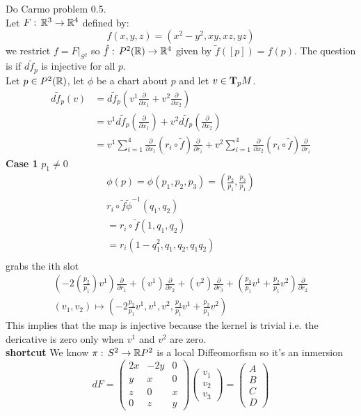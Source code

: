 Do Carmo problem 0.5.\\
Let $F:\, \mathbb{R}^3 \to \mathbb{R}^4$ defined by:
$$f(x,y,z) = (x^2-y^2, xy, xz, yz)$$
we restrict $f=F|_{S^2}$ so $\hat f :\, P^2(\mathbb{R}) \to \mathbb{R}^4$ given by $\tilde f([p])=f(p)$. The question is if $d\tilde f_p$ is injective for all $p$.\\
Let $p\in P^2(\mathbb{R})$, let $\phi$ be a chart about $p$ and let $v\in \text{\textbf{T}}_pM$.
\begin{align*}
d\tilde f_p(v) &= d\tilde f_p(v^1\frac{\partial}{\partial x_1} + v^2 \frac{\partial}{\partial x_ 2} ) \\
%
&= v^1 d\tilde f_p(\frac{\partial}{\partial x_1} ) + v^2d\tilde f_p(\frac{\partial}{\partial x_2} )\\
%
&= v^1 \sum_{i=1}^4 \frac{\partial}{\partial x_1} (r_i\circ \tilde f) \frac{\partial}{\partial r_i} + v^2 \sum_{i=1}^4 \frac{\partial}{\partial x_2} (r_i\circ \tilde f) \frac{\partial}{\partial r_i}
\end{align*}
\textbf{Case 1} $p_1 \neq 0$ 
\begin{gather*}
 \phi(p)=\phi(p_1,p_2,p_3) = \left(\frac{p_2}{p_1}, \frac{p_3}{p_1} \right)\\
r_i\circ \tilde f \tilde \phi ^{-1} (q_1,q_2)\\
= r_i\circ \tilde f(1,q_1,q_2) \\
= r_i(1-q_1^2,q_1,q_2,q_1q_2)\\
\end{gather*}
grabs the ith slot  
\begin{gather*}
(-2\left(\frac{p_2}{p_1}\right)v^1) \frac{\partial}{\partial r_1}  + (v^1) \frac{\partial}{\partial r_2} + (v^2) \frac{\partial}{\partial r_3} + (\frac{p_3}{p_1} v^1 + \frac{p_2}{p_1} v^2) \frac{\partial}{\partial r_2} \\
(v_1,v_2) \mapsto \left(-2\frac{p_2}{p_1} v^1,v^1,v^2,\frac{p_3}{p_1}v^1 + \frac{p_2}{p_1}v^2 \right)
\end{gather*}
This implies that the map is injective because the kernel is trivial i.e. the dericative is zero only when $v^1$ and $v^2$ are zero.\\
\textbf{shortcut}
We know $\pi:\, S^2 \to \mathbb{R} P^2$ is a local Diffeomorfism so it's an inmersion
\begin{equation*}
dF= \left( \begin{array}{cc|c}
2x & -2y & 0 \\
y  &   x & 0 \\
\hline
z  & 0 & x  \\
0 & z & y  
\end{array}\right)
\begin{pmatrix} v_1 \\ v_2 \\ v_3
\end{pmatrix}=
\begin{pmatrix}
A \\ B \\ C \\ D 
\end{pmatrix}
\end{equation*}
